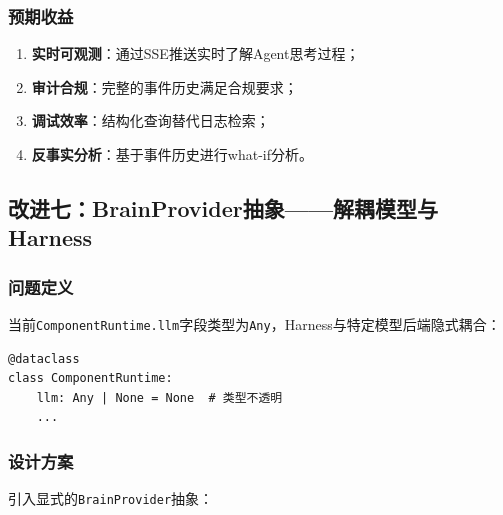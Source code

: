 \documentclass[12pt,a4paper]{ctexart}
\begin{document}
\subsubsection{预期收益}

\begin{enumerate}
    \item \textbf{实时可观测}：通过SSE推送实时了解Agent思考过程；
    \item \textbf{审计合规}：完整的事件历史满足合规要求；
    \item \textbf{调试效率}：结构化查询替代日志检索；
    \item \textbf{反事实分析}：基于事件历史进行what-if分析。
\end{enumerate}

\subsection{改进七：BrainProvider抽象——解耦模型与Harness}

\subsubsection{问题定义}

当前\texttt{ComponentRuntime.llm}字段类型为\texttt{Any}，Harness与特定模型后端隐式耦合：

\begin{lstlisting}[caption={当前模糊的LLM接口}]
@dataclass
class ComponentRuntime:
    llm: Any | None = None  # 类型不透明
    ...
\end{lstlisting}

\subsubsection{设计方案}

引入显式的\texttt{BrainProvider}抽象：
\end{document}
